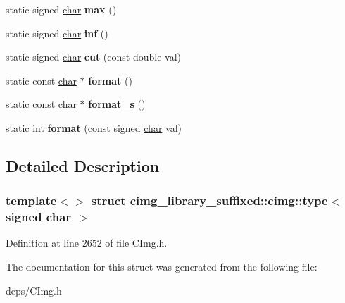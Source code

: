 \begin{DoxyCompactItemize}
\mbox{\label{structcimg__library__suffixed_1_1cimg_1_1type_3_01signed_01char_01_4_ae76fdedebf48dbc9c66e8e212cb89226}} 
static signed \hyperlink{classchar}{char} {\bfseries max} ()
\item 
\mbox{\label{structcimg__library__suffixed_1_1cimg_1_1type_3_01signed_01char_01_4_aa9548233a0fdbc5ad6dfe28599d04e5c}} 
static signed \hyperlink{classchar}{char} {\bfseries inf} ()
\item 
\mbox{\label{structcimg__library__suffixed_1_1cimg_1_1type_3_01signed_01char_01_4_ab659908621902fda17a1378fd410a928}} 
static signed \hyperlink{classchar}{char} {\bfseries cut} (const double val)
\item 
\mbox{\label{structcimg__library__suffixed_1_1cimg_1_1type_3_01signed_01char_01_4_a745053d72358fd9aa75ded7c9fa73abc}} 
static const \hyperlink{classchar}{char} $\ast$ {\bfseries format} ()
\item 
\mbox{\label{structcimg__library__suffixed_1_1cimg_1_1type_3_01signed_01char_01_4_a57da37d8702b5b37a9d0feee235b4d84}} 
static const \hyperlink{classchar}{char} $\ast$ {\bfseries format\+\_\+s} ()
\item 
\mbox{\label{structcimg__library__suffixed_1_1cimg_1_1type_3_01signed_01char_01_4_a9e4e6d7c05247510919dae76a3a10f8c}} 
static int {\bfseries format} (const signed \hyperlink{classchar}{char} val)
\end{DoxyCompactItemize}


\subsection{Detailed Description}
\subsubsection*{template$<$$>$\newline
struct cimg\+\_\+library\+\_\+suffixed\+::cimg\+::type$<$ signed char $>$}



Definition at line 2652 of file C\+Img.\+h.



The documentation for this struct was generated from the following file\+:\begin{DoxyCompactItemize}
\item 
deps/C\+Img.\+h\end{DoxyCompactItemize}
